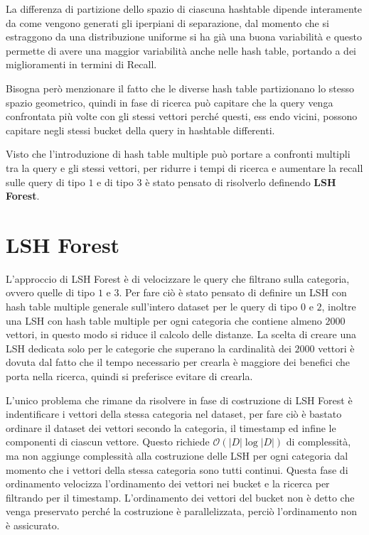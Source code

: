 La differenza di partizione dello spazio di ciascuna hashtable dipende interamente 
da come vengono generati gli iperpiani di separazione, dal momento che si estraggono 
da una distribuzione uniforme si ha già una buona variabilità e questo permette di avere 
una maggior variabilità anche nelle hash table, portando a dei miglioramenti in termini di 
Recall.

Bisogna però menzionare il fatto che le diverse hash table partizionano lo stesso 
spazio geometrico, quindi in fase di ricerca può capitare che la query venga confrontata 
più volte con gli stessi vettori perché questi, ess endo vicini, possono capitare 
negli stessi bucket della query in hashtable differenti.

Visto che l'introduzione di hash table multiple può portare a confronti multipli 
tra la query e gli stessi vettori, per ridurre i tempi di ricerca e aumentare 
la recall sulle query di tipo $1$ e di tipo $3$ è stato pensato di risolverlo 
definendo \textbf{LSH Forest}.

\section{LSH Forest}
L'approccio di LSH Forest è di velocizzare le query che filtrano sulla categoria,
ovvero quelle di tipo $1$ e $3$. Per fare ciò è stato pensato di definire un LSH
con hash table multiple generale sull'intero dataset per le query di tipo $0$ e $2$, 
inoltre una LSH con hash table multiple per ogni categoria che contiene almeno $2000$ 
vettori, in questo modo si riduce il calcolo delle distanze. La scelta di creare 
una LSH dedicata solo per le categorie che superano la cardinalità dei $2000$ vettori 
è dovuta dal fatto che il tempo necessario per crearla è maggiore dei benefici 
che porta nella ricerca, quindi si preferisce evitare di crearla.

L'unico problema che rimane da risolvere in fase di costruzione di LSH Forest è 
indentificare i vettori della stessa categoria nel dataset, per fare ciò è bastato 
ordinare il dataset dei vettori secondo la categoria, il timestamp ed infine 
le componenti di ciascun vettore. Questo richiede $\mathcal{O}(|D|\log |D|)$ di 
complessità, ma non aggiunge complessità alla costruzione delle LSH per ogni categoria 
dal momento che i vettori della stessa categoria sono tutti continui. Questa 
fase di ordinamento velocizza l'ordinamento dei vettori nei bucket e la ricerca 
per filtrando per il timestamp. L'ordinamento dei vettori del bucket non è detto 
che venga preservato perché la costruzione è parallelizzata, perciò l'ordinamento 
non è assicurato.

